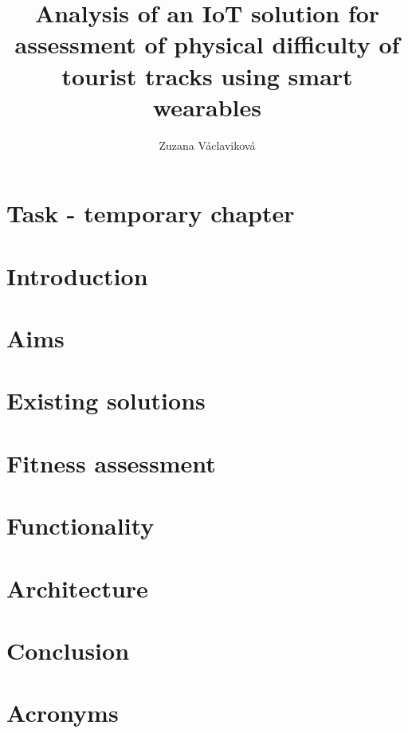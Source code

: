 \documentclass[thesis=B,english]{FITthesis}[2019/03/21]
\title{Analysis of an IoT solution for assessment of physical difficulty of tourist tracks using smart wearables}
\author{Zuzana Václaviková} %
\begin{document}


\chapter{Task - temporary chapter}


\chapter{Introduction}


\chapter{Aims}


\chapter{Existing solutions}

\chapter{Fitness assessment}

\chapter{Functionality}

\chapter{Architecture}


\chapter{Conclusion}





\appendix

\chapter{Acronyms}

\end{document}
